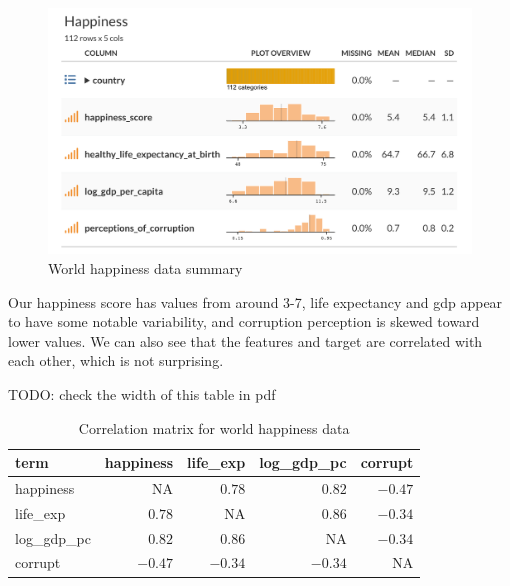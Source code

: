 \documentclass[
  letterpaper,
]{krantz}
\begin{document}
\begin{figure}

{\centering \includegraphics[width=1\textwidth,height=\textheight]{img/happiness_data_summary.png}

}

\caption{World happiness data summary}

\end{figure}

Our happiness score has values from around 3-7, life expectancy and gdp
appear to have some notable variability, and corruption perception is
skewed toward lower values. We can also see that the features and target
are correlated with each other, which is not surprising.

TODO: check the width of this table in pdf

\small

\begin{longtable}{lrrrr}
\caption{Correlation matrix for world happiness data}\tabularnewline

\toprule
term & happiness & life\_exp & log\_gdp\_pc & corrupt \\ 
\midrule\addlinespace[2.5pt]
happiness & \textcolor[HTML]{404040}{NA} & \textcolor[HTML]{404040}{$0.78$} & \textcolor[HTML]{404040}{$0.82$} & \textcolor[HTML]{404040}{$-0.47$} \\ 
life\_exp & \textcolor[HTML]{404040}{$0.78$} & \textcolor[HTML]{404040}{NA} & \textcolor[HTML]{404040}{$0.86$} & \textcolor[HTML]{404040}{$-0.34$} \\ 
log\_gdp\_pc & \textcolor[HTML]{404040}{$0.82$} & \textcolor[HTML]{404040}{$0.86$} & \textcolor[HTML]{404040}{NA} & \textcolor[HTML]{404040}{$-0.34$} \\ 
corrupt & \textcolor[HTML]{404040}{$-0.47$} & \textcolor[HTML]{404040}{$-0.34$} & \textcolor[HTML]{404040}{$-0.34$} & \textcolor[HTML]{404040}{NA} \\ 
\bottomrule
\end{longtable}
\end{document}
